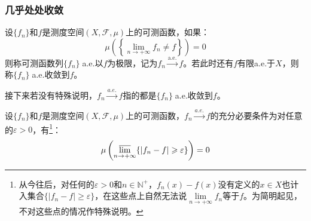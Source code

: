 \subsubsection{几乎处处收敛}
\begin{definition}
	设$\{f_n\}$和$f$是测度空间$(X,\mathscr{F},\mu)$上的可测函数，如果：
	\begin{equation*}
		\mu\left(\left\{\lim_{n\to+\infty}f_n\ne f\right\}\right)=0
	\end{equation*}
	则称可测函数列$\{f_n\}\;$a.e.以$f$为极限，记为$f_n\overset{\text{a.e.}}{\longrightarrow}f$。若此时还有$f$有限a.e.于$X$，则称$\{f_n\}\;$a.e.收敛到$f$。
\end{definition}
\begin{note}
	接下来若没有特殊说明，$f_n\overset{a.e.}{\longrightarrow}f$指的都是$\{f_n\}\;$a.e.收敛到$f$。
\end{note}
\begin{theorem}\label{theo:EquiConditiona.e.}
	设$\{f_n\}$和$f$是测度空间$(X,\mathscr{F},\mu)$上的可测函数，$f_n\overset{a.e.}{\longrightarrow}f$的充分必要条件为对任意的$\varepsilon>0$，有\footnote{从今往后，对任何的$\varepsilon>0$和$n\in\mathbb{N}^+$，$f_n(x)-f(x)$没有定义的$x\in X$也计入集合$\{|f_n-f|\geqslant\varepsilon\}$，在这些点上自然无法说$\lim\limits_{n\to+\infty}f_n$等于$f$。为简明起见，不对这些点的情况作特殊说明。}：
	\begin{equation*}
		\mu\left(\varlimsup_{n\to+\infty}\{|f_n-f|\geqslant\varepsilon\}\right)=0
	\end{equation*}
\end{theorem}
